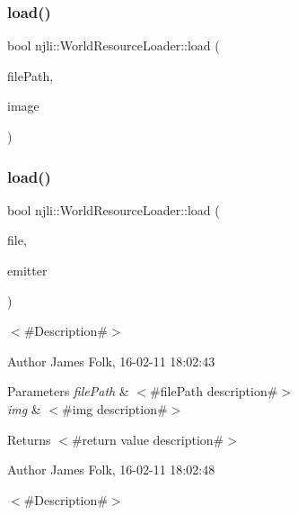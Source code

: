 \mbox{\label{classnjli_1_1_world_resource_loader_ada8da80bfd97fbec5be2f0ba1efe0fa0}} 
\subsubsection{\texorpdfstring{load()}{load()}\hspace{0.1cm}{\footnotesize\ttfamily [1/13]}}
{\footnotesize\ttfamily bool njli\+::\+World\+Resource\+Loader\+::load (\begin{DoxyParamCaption}\item[{const char $\ast$}]{file\+Path,  }\item[{\mbox{\hyperlink{classnjli_1_1_image}{Image}} $\ast$}]{image }\end{DoxyParamCaption})}

\mbox{\label{classnjli_1_1_world_resource_loader_aeeb978f3bd043a6647584f223776525c}} 
\subsubsection{\texorpdfstring{load()}{load()}\hspace{0.1cm}{\footnotesize\ttfamily [2/13]}}
{\footnotesize\ttfamily bool njli\+::\+World\+Resource\+Loader\+::load (\begin{DoxyParamCaption}\item[{const char $\ast$}]{file,  }\item[{\mbox{\hyperlink{classnjli_1_1_particle_emitter}{Particle\+Emitter}} $\ast$}]{emitter }\end{DoxyParamCaption})}



$<$\#\+Description\#$>$ 

\begin{DoxyAuthor}{Author}
James Folk, 16-\/02-\/11 18\+:02\+:43
\end{DoxyAuthor}

\begin{DoxyParams}{Parameters}
{\em file\+Path} & $<$\#file\+Path description\#$>$ \\
\hline
{\em img} & $<$\#img description\#$>$\\
\hline
\end{DoxyParams}
\begin{DoxyReturn}{Returns}
$<$\#return value description\#$>$ 
\end{DoxyReturn}
\begin{DoxyAuthor}{Author}
James Folk, 16-\/02-\/11 18\+:02\+:48
\end{DoxyAuthor}
$<$\#\+Description\#$>$


